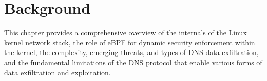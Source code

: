 \documentclass [11pt, proquest] {uwthesis}[2020/02/24]
\begin{document}

\chapter {Background}
This chapter provides a comprehensive overview of the internals of the Linux kernel network stack, the role of eBPF for dynamic security enforcement within the kernel, the complexity, emerging threats, and types of DNS data exfiltration, and the fundamental limitations of the DNS protocol that enable various forms of data exfiltration and exploitation.
\end{document}
